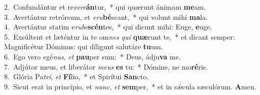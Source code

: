 {2.~}Confundántur et re\textit{ve}\textit{re}\textbf{án}tur,~* qui quærunt ánimam \textbf{me}am.\\
{3.~}Avertántur retrórsum, et \textit{e}\textit{ru}\textbf{bé}scant,~* qui volunt mihi \textbf{ma}la.\\
{4.~}Avertántur statim e\textit{ru}\textit{be}\textbf{scén}tes,~* qui dicunt mihi: Euge, \textbf{e}uge.\\
{5.~}Exsúltent et læténtur in te om\textit{nes} \textit{qui} \textbf{quæ}runt te,~* et dicant semper: Magnificétur Dóminus: qui díligunt salutáre \textbf{tu}um.\\
{6.~}Ego vero egé\textit{nus}, \textit{et} \textbf{pau}per sum:~* Deus, ádju\textbf{va} me.\\
{7.~}Adjútor meus, et liberátor \textit{me}\textit{us} \textbf{es} tu:~* Dómine, ne mo\textbf{ré}ris.\\
{8.~}Glória Pa\textit{tri}, \textit{et} \textbf{Fí}lio,~* et Spirítui \textbf{San}cto.\\
{9.~}Sicut erat in princípio, et \textit{nunc}, \textit{et} \textbf{sem}per,~* et in sǽcula sæculórum. \textbf{A}men.\\
